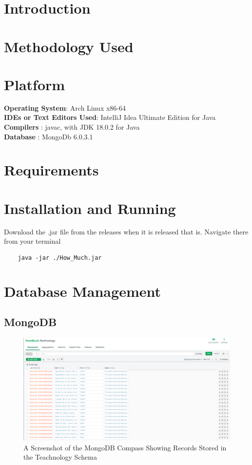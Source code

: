 \documentclass[11pt]{article}
\begin{document}
\tableofcontents
\thispagestyle{empty}
\clearpage

\setcounter{page}{1}

\section{Introduction}

\section{Methodology Used}

\section{Platform}
\textbf{Operating System}: Arch Linux x86-64 \\
\textbf{IDEs or Text Editors Used}: IntelliJ Idea Ultimate Edition for Java\\
\textbf{Compilers} : javac, with JDK 18.0.2 for Java\\
\textbf{Database} : MongoDb 6.0.3.1

\section{Requirements}

\section{Installation and Running}
Download the .jar file from the releases when it is released that is.
Navigate there from your terminal
\begin{verbatim}
	java -jar ./How_Much.jar
\end{verbatim}

\section{Database Management}
\subsection{MongoDB}
\begin{figure}[H]
	\centering
	\includegraphics[scale=0.4]{mongo 1.png}
	\caption{A Screenshot of the MongoDB Compass Showing Records Stored in the Teachnology Schema}
\end{figure}
\end{document}

